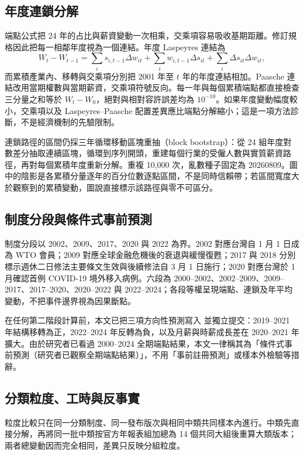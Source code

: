\documentclass[12pt]{article}
\begin{document}
\subsection{年度連鎖分解}

端點公式把 24 年的占比與薪資變動一次相乘，交乘項容易吸收基期距離。修訂規格因此把每一相鄰年度視為一個連結。年度 Laspeyres 連結為
\[
W_t-W_{t-1}=\sum_i s_{i,t-1}\Delta w_{it}
+\sum_i w_{i,t-1}\Delta s_{it}
+\sum_i\Delta s_{it}\Delta w_{it},
\]
而累積產業內、移轉與交乘項分別把 2001 年至 $t$ 年的年度連結相加。Paasche 連結改用當期權數與當期薪資，交乘項符號反向。每一年與每個累積端點都直接檢查三分量之和等於 $W_t-W_0$，絕對與相對容許誤差均為 $10^{-10}$。如果年度變動幅度較小，交乘項以及 Laspeyres--Paasche 配置差異應比端點分解縮小；這是一項方法診斷，不是經濟機制的先驗限制。

連鎖路徑的區間仍採三年循環移動區塊重抽（block bootstrap）：從 24 組年度對數差分抽取連續區塊，循環到序列開頭，重建每個行業的受僱人數與實質薪資路徑，再對每個累積年度重新分解。重複 10,000 次，亂數種子固定為 20260809。圖中的陰影是各累積分量逐年的百分位數逐點區間，不是同時信賴帶；若區間寬度大於觀察到的累積變動，圖說直接標示該路徑與零不可區分。

\subsection{制度分段與條件式事前預測}

制度分段以 2002、2009、2017、2020 與 2022 為界。2002 對應台灣自 1 月 1 日成為 WTO 會員\citep{wto2002}；2009 對應全球金融危機後的衰退與緩慢復甦\citep{imf2009}；2017 與 2018 分別標示週休二日修法主要條文生效與後續修法自 3 月 1 日施行\citep{mol2016,mol2018}；2020 對應台灣於 1 月確認首例 COVID-19 境外移入病例\citep{taiwancdc2020}。六段為 2000--2002、2002--2009、2009--2017、2017--2020、2020--2022 與 2022--2024；各段等權呈現端點、連鎖及年平均變動，不把事件邊界視為因果斷點。

在任何第二階段計算前，本文已把三項方向性預測寫入  並獨立提交：2019--2021 年結構移轉為正，2022--2024 年反轉為負，以及月薪與時薪成長差在 2020--2021 年擴大。由於研究者已看過 2000--2024 全期端點結果，本文一律稱其為「條件式事前預測（研究者已觀察全期端點結果）」，不用「事前註冊預測」或樣本外檢驗等措辭。

\subsection{分類粒度、工時與反事實}

粒度比較只在同一分類制度、同一發布版次與相同中類共同樣本內進行。中類先直接分解，再將同一批中類按官方年報表組加總為 14 個共同大組後重算大類版本；兩者總變動因而完全相同，差異只反映分組粒度。
\end{document}
